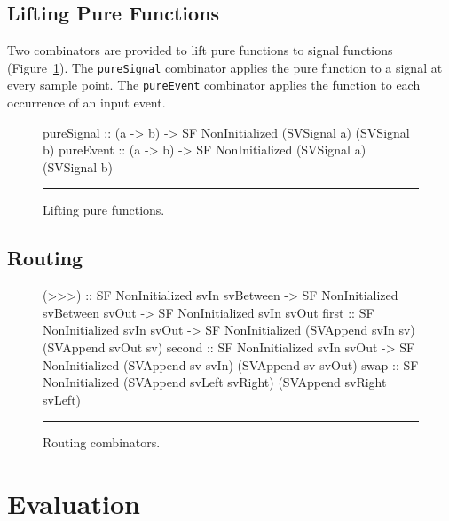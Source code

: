 \subsection{Lifting Pure Functions}
\label{subsection:System_Design_and_Interface-Combinators-Lifting_Pure_Functions}

Two combinators are provided to lift pure functions to signal functions (Figure~\ref{figure:lifting_pure_functions}).
The {\tt pureSignal} combinator applies the pure function to a signal at every
sample point. The {\tt pureEvent} combinator applies the function to each
occurrence of an input event.

\begin{figure}
\begin{code}
pureSignal ::    (a -> b) 
              -> SF NonInitialized (SVSignal a) (SVSignal b)
pureEvent  ::    (a -> b)
              -> SF NonInitialized (SVSignal a) (SVSignal b)
\end{code}
\hrule
\caption{Lifting pure functions.}
\label{figure:lifting_pure_functions}
\end{figure}

\subsection{Routing}
\label{subsection:System_Design_and_Interface-Combinators-Routing}

\begin{figure}
\begin{code}
(>>>)       ::    SF NonInitialized svIn svBetween
               -> SF NonInitialized svBetween svOut
               -> SF NonInitialized svIn svOut
first       ::    SF NonInitialized svIn svOut
               -> SF NonInitialized (SVAppend svIn sv)
                                    (SVAppend svOut sv)
second      ::    SF NonInitialized svIn svOut
               -> SF NonInitialized (SVAppend sv svIn)
                                    (SVAppend sv svOut)
swap        ::    SF NonInitialized (SVAppend svLeft svRight) 
                                    (SVAppend svRight svLeft)
\end{code}
\hrule
\caption{Routing combinators.}
\label{figure:routing_combinators}
\end{figure}

\section{Evaluation}
\label{section:System_Design_and_Interface-Evaluator}

